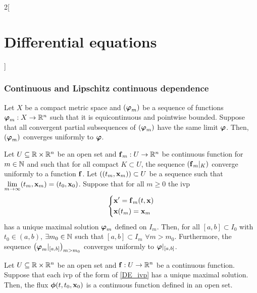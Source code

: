 \documentclass[../../../main.tex]{subfiles}
\begin{document}
\begin{multicols}{2}[\section{Differential equations}]
  \subsubsection{Continuous and Lipschitz continuous dependence}
  \begin{lemma}
    Let $X$ be a compact metric space and $(\boldsymbol{\mathrm{\varphi}}_m)$ be a sequence of functions $\boldsymbol{\mathrm{\varphi}}_m:X\rightarrow\mathbb{R}^n$ such that it is equicontinuous and pointwise bounded. Suppose that all convergent partial subsequences of $(\boldsymbol{\mathrm{\varphi}}_m)$ have the same limit $\boldsymbol{\mathrm{\varphi}}$. Then, $(\boldsymbol{\mathrm{\varphi}}_m)$ converges uniformly to $\boldsymbol{\mathrm{\varphi}}$.
  \end{lemma}
  \begin{prop}
    Let $U\subseteq\mathbb{R}\times\mathbb{R}^n$ be an open set and $\boldsymbol{\mathrm{f}}_m:U\rightarrow\mathbb{R}^n$ be continuous function for $m\in\mathbb{N}$ and such that for all compact $K\subset U$, the sequence $(\boldsymbol{\mathrm{f}}_m|_K)$ converge uniformly to a function $\boldsymbol{\mathrm{f}}$. Let $((t_m,\boldsymbol{\mathrm{x}}_m))\subset U$ be a sequence such that $\displaystyle\lim_{m\to\infty}(t_m,\boldsymbol{\mathrm{x}}_m)=(t_0,\boldsymbol{\mathrm{x}}_0)$. Suppose that for all $m\geq 0$ the ivp
    \begin{equation*}
      \left\{
      \begin{aligned}
         & \boldsymbol{\mathrm{x}}'      =\boldsymbol{\mathrm{f}}_m(t,\boldsymbol{\mathrm{x}}) \\
         & \boldsymbol{\mathrm{x}}(t_m)  =\boldsymbol{\mathrm{x}}_m
      \end{aligned}
      \right.
    \end{equation*}
    has a unique maximal solution $\boldsymbol{\mathrm{\varphi}}_m$ defined on $I_m$. Then, for all $[a,b]\subset I_0$ with $t_0\in(a,b)$, $\exists m_0\in\mathbb{N}$ such that $[a,b]\subset I_m$ $\forall m>m_0$. Furthermore, the sequence $\left(\boldsymbol{\mathrm{\varphi}}_m|_{[a,b]}\right)_{m>m_0}$ converges uniformly to $\boldsymbol{\mathrm{\varphi}}|_{[a,b]}$.
  \end{prop}
  \begin{theorem}
    Let $U\subseteq\mathbb{R}\times\mathbb{R}^n$ be an open set and $\boldsymbol{\mathrm{f}}:U\rightarrow\mathbb{R}^n$ be a continuous function. Suppose that each ivp of the form of \eqref{DE_ivp} has a unique maximal solution. Then, the flux $\boldsymbol{\mathrm{\phi}}(t,t_0,\boldsymbol{\mathrm{x}}_0)$ is a continuous function defined in an open set.
  \end{theorem}
  \begin{theorem}

\end{theorem}
\end{multicols}
\end{document}
